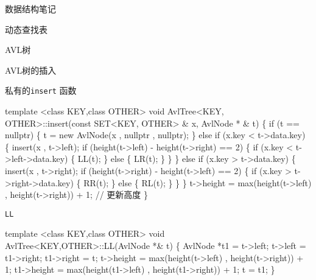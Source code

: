 \documentclass[
  ignorenonframetext,
]{beamer}
\newenvironment{Shaded}{}{}
\newcommand{\NormalTok}[1]{#1}
\begin{document}
\begin{frame}[fragile]{数据结构笔记}
\begin{block}{动态查找表}
\begin{block}{AVL树}
\begin{block}{AVL树的插入}
\begin{block}{私有的\texttt{insert} 函数}
\protect{}\label{ux79c1ux6709ux7684insert-ux51fdux6570}
\begin{Shaded}
\begin{Highlighting}[]
\NormalTok{template \textless{}class KEY,class OTHER\textgreater{}}
\NormalTok{void AvlTree\textless{}KEY, OTHER\textgreater{}::insert(const SET\textless{}KEY, OTHER\textgreater{} \& x, AvlNode * \& t)}
\NormalTok{\{}
\NormalTok{  if (t == nullptr)}
\NormalTok{  \{}
\NormalTok{    t = new AvlNode(x , nullptr , nullptr);}
\NormalTok{  \}}
\NormalTok{  else if (x.key \textless{} t{-}\textgreater{}data.key)}
\NormalTok{  \{}
\NormalTok{    insert(x , t{-}\textgreater{}left);}
\NormalTok{    if (height(t{-}\textgreater{}left) {-} height(t{-}\textgreater{}right) == 2)}
\NormalTok{    \{}
\NormalTok{      if (x.key \textless{} t{-}\textgreater{}left{-}\textgreater{}data.key)}
\NormalTok{      \{}
\NormalTok{        LL(t);}
\NormalTok{      \}}
\NormalTok{      else}
\NormalTok{      \{}
\NormalTok{        LR(t);}
\NormalTok{      \}}
\NormalTok{    \}}
\NormalTok{  \}}
\NormalTok{  else if (x.key \textgreater{} t{-}\textgreater{}data.key)}
\NormalTok{  \{}
\NormalTok{    insert(x , t{-}\textgreater{}right);}
\NormalTok{    if (height(t{-}\textgreater{}right) {-} height(t{-}\textgreater{}left) == 2)}
\NormalTok{    \{}
\NormalTok{      if (x.key \textgreater{} t{-}\textgreater{}right{-}\textgreater{}data.key)}
\NormalTok{      \{}
\NormalTok{        RR(t);}
\NormalTok{      \}}
\NormalTok{      else}
\NormalTok{      \{}
\NormalTok{        RL(t);}
\NormalTok{      \}}
\NormalTok{    \}}
\NormalTok{  \}}
\NormalTok{  t{-}\textgreater{}height = max(height(t{-}\textgreater{}left) , height(t{-}\textgreater{}right)) + 1; // 更新高度}
\NormalTok{\}}
\end{Highlighting}
\end{Shaded}

\begin{block}{\texttt{LL}}
\protect{}\label{ll}
\begin{Shaded}
\begin{Highlighting}[]
\NormalTok{template \textless{}class KEY,class OTHER\textgreater{}}
\NormalTok{void AvlTree\textless{}KEY,OTHER\textgreater{}::LL(AvlNode *\& t)}
\NormalTok{\{}
\NormalTok{  AvlNode *t1 = t{-}\textgreater{}left;}
\NormalTok{  t{-}\textgreater{}left = t1{-}\textgreater{}right;}
\NormalTok{  t1{-}\textgreater{}right = t;}
\NormalTok{  t{-}\textgreater{}height = max(height(t{-}\textgreater{}left) , height(t{-}\textgreater{}right)) + 1;}
\NormalTok{  t1{-}\textgreater{}height = max(height(t1{-}\textgreater{}left) , height(t1{-}\textgreater{}right)) + 1;}
\NormalTok{  t = t1;}
\NormalTok{\}}
\end{Highlighting}
\end{Shaded}
\end{block}


\end{block}
\end{block}
\end{block}
\end{block}
\end{frame}
\end{document}
